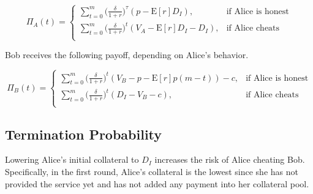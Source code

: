 \documentclass[runningheads]{llncs}
\newcommand{\dom}[1]{\todo[linecolor=green,backgroundcolor=green!25,bordercolor=green,inline,caption={}]{Comment by Dominik: #1}}
\begin{document}
\begin{equation}
\label{eq:time_alice}
\Pi_A(t) = 
\begin{cases}
    \sum_{t=0}^{m} \big( \frac{\delta}{1+r} \big)^{\tau} ( p - \mathrm{E}[r]D_{I}), & \text{if Alice is honest} \\
    \sum_{t=0}^{m} \big( \frac{\delta}{1+r} \big)^{t} (V_A - \mathrm{E}[r]D_{I}-D_{I}), & \text{if Alice cheats} \\
\end{cases}
\end{equation}




Bob receives the following payoff, depending on Alice's behavior.

\begin{equation}
\label{eq:time_bob}
\Pi_B (t) = 
\begin{cases}
\sum_{t=0}^{m} \big( \frac{\delta}{1+r} \big)^t (V_B - p - \mathrm{E}[r]p(m-t)) - c, & \text{if Alice is honest} \\
\sum_{t=0}^{m} \big( \frac{\delta}{1+r} \big)^t (D_{I} -V_B -c) , & \text{if Alice cheats} \\
\end{cases}
\end{equation}


\subsection{Termination Probability}
Lowering Alice's initial collateral to $D_I$ increases the risk of Alice cheating Bob.
Specifically, in the first round, Alice's collateral is the lowest since she has not provided the service yet and has not added any payment into her collateral pool.
\end{document}
